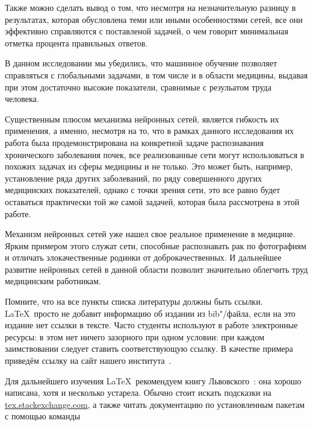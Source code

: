 Также можно сделать вывод о том, что несмотря на незначительную разницу в результатах, которая обусловлена теми или иными особенностями сетей, все они эффективно справляются с поставленой задачей, о чем говорит минимальная отметка процента правильных ответов. 
\newpage 

\Conc
В данном исследовании мы убедились, что машинное обучение позволяет справляться с глобальными задачами, в том числе и в области медицины, выдавая при этом достаточно высокие показатели, сравнимые с резульатом труда человека. 

Существенным плюсом механизма нейронных сетей, является гибкость их применения, а именно, несмотря на то, что в рамках данного исследования их работа была продемонстрирована на конкретной задаче распознавания хронического заболевания почек, все реализованные сети могут использоваться в похожих задачах из сферы медицины и не только. Это может быть, например, установление ряда других заболеваний, по ряду совершенного других медицинских показателей, однако с точки зрения сети, это все равно будет оставаться практически той же самой задачей, которая была рассмотрена в этой работе.

Механизм нейронных сетей уже нашел свое реальное применение в медицине. Ярким примером этого служат сети, способные распознавать рак по фотографиям и отличать злокачественные родинки от доброкачественных. И дальнейшее развитие нейронных сетей в данной области позволит значительно облегчить труд медицинским работникам.\cite{TanAus2013}

\newpage
Помните, что на все пункты списка литературы должны быть ссылки. \LaTeX\ просто не добавит информацию об издании из bib"/файла, если на это издание нет ссылки в тексте. Часто студенты используют в работе  электронные ресурсы: в этом нет ничего зазорного при одном условии: при каждом заимствовании следует ставить соответствующую ссылку. В качестве примера приведём ссылку на сайт нашего института~\autocite{mmcs}.

Для дальнейшего изучения \LaTeX\ рекомендуем книгу Львовского~\autocite{Lvo2003}: она хорошо написана, хотя и несколько устарела.
Обычно стоит искать подсказки на
\href{http://tex.stackexchange.com/}{tex.stackexchange.com}, а также
читать документацию по установленным пакетам с помощью
команды


\printbibliography[%
    heading=bibintoc%
]

